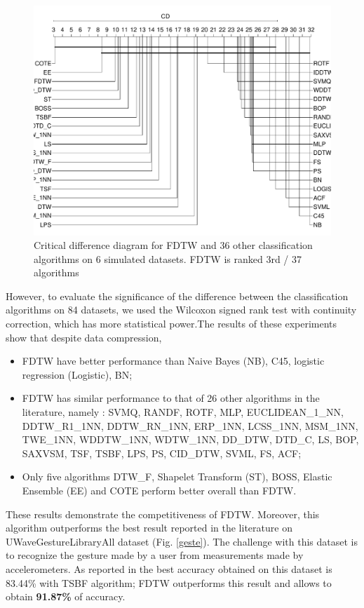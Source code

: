 \begin{figure}
\centering
\includegraphics[scale=0.28]{images/cd1}
\caption{Critical difference diagram for FDTW and $36$ other classification algorithms on 6 simulated datasets. FDTW is ranked 3rd / 37 algorithms}

\label{cd2}
\end{figure}



However, to evaluate the significance of the difference between the classification algorithms on 84 datasets, we used the Wilcoxon signed rank test with continuity correction, which has more statistical power.The results of these experiments  show that despite data compression, 
\begin{itemize}
  \item  FDTW have better performance than Naive Bayes (NB), C45,  logistic regression (Logistic), BN;
  \item FDTW has similar performance to that of 26 other algorithms in the literature, namely : SVMQ, RANDF, ROTF, MLP, EUCLIDEAN\_1\_NN, DDTW\_R1\_1NN, DDTW\_RN\_1NN, ERP\_1NN, LCSS\_1NN, MSM\_1NN, TWE\_1NN, WDDTW\_1NN, WDTW\_1NN, DD\_DTW, DTD\_C, LS, BOP, SAXVSM, TSF, TSBF, LPS, PS, CID\_DTW, SVML, FS, ACF;
  \item Only five algorithms DTW\_F, Shapelet Transform (ST), BOSS, Elastic Ensemble (EE) and COTE perform better overall than FDTW.
\end{itemize}

These results demonstrate the competitiveness of FDTW. Moreover, this algorithm
outperforms the best result reported in the literature on  UWaveGestureLibraryAll dataset (Fig.
\ref{geste}).
The challenge with this dataset is to recognize the gesture made by a user
from measurements made by accelerometers. As reported in \cite{Bagnall} the best accuracy obtained
on this dataset is 83.44\% with TSBF algorithm; FDTW outperforms this result and allows to obtain \textbf{91.87\%} of accuracy.


